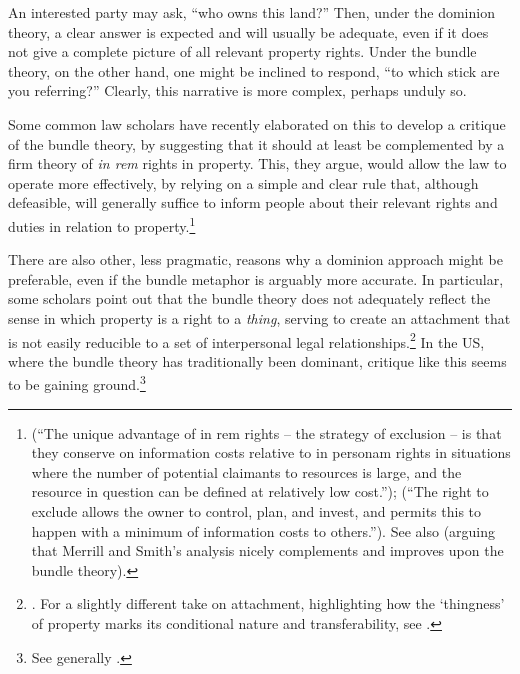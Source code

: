 An interested party may ask, ``who owns this land?'' Then, under the dominion theory, a clear answer is expected and will usually be adequate, even if it does not give a complete picture of all relevant property rights. Under the bundle theory, on the other hand, one might be inclined to respond, ``to which stick are you referring?'' Clearly, this narrative is more complex, perhaps unduly so. 

Some common law scholars have recently elaborated on this to develop a critique of the bundle theory, by suggesting that it should at least be complemented by a firm theory of {\it in rem} rights in property. This, they argue, would allow the law to operate more effectively, by relying on a simple and clear rule that, although defeasible, will generally suffice to inform people about their relevant rights and duties in relation to property.\footnote{\cite[793]{merrill01b} (``The unique advantage of in rem rights -- the strategy of exclusion -- is that they conserve on information costs relative to in personam rights in situations where the number of potential claimants to resources is large, and the resource in question can be defined at relatively low cost.''); \cite[389]{merrill01} (``The right to exclude allows the owner to control, plan, and invest, and permits this to happen with a minimum of information costs to others.''). See also \cite{ellickson11} (arguing that Merrill and Smith's analysis nicely complements and improves upon the bundle theory).} 

There are also other, less pragmatic, reasons why a dominion approach might be preferable, even if the bundle metaphor is arguably more accurate. In particular, some scholars point out that the bundle theory does not adequately reflect the sense in which property is a right to a {\it thing}, serving to create an attachment that is not easily reducible to a set of interpersonal legal relationships.\footnote{\cite[1862]{merrill07}. For a slightly different take on attachment, highlighting how the `thingness' of property marks its conditional nature and transferability, see \cite[799-818]{penner96}.} In the US, where the bundle theory has traditionally been dominant, critique like this seems to be gaining ground.\footnote{See generally \cite{foster10}.}

